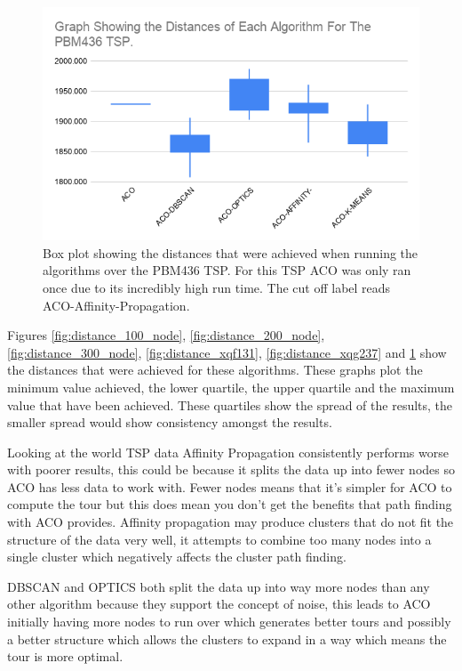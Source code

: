 \begin{figure}
    \centering
    \includegraphics[width=\textwidth]{figures/distance_pbm436_graph.png}
    \caption{Box plot showing the distances that were achieved when running the algorithms over the PBM436 TSP. For this TSP ACO was only ran once due to its incredibly high run time. The cut off label reads ACO-Affinity-Propagation.}
    \label{fig:distance_pbm436}
\end{figure}

Figures \ref{fig:distance_100_node}, \ref{fig:distance_200_node}, \ref{fig:distance_300_node}, \ref{fig:distance_xqf131}, \ref{fig:distance_xqg237} and \ref{fig:distance_pbm436} show the distances that were achieved for these algorithms. These graphs plot the minimum value achieved, the lower quartile, the upper quartile and the maximum value that have been achieved. These quartiles show the spread of the results, the smaller spread would show consistency amongst the results. 

Looking at the world TSP data Affinity Propagation consistently performs worse with poorer results, this could be because it splits the data up into fewer nodes so ACO has less data to work with. Fewer nodes means that it's simpler for ACO to compute the tour but this does mean you don't get the benefits that path finding with ACO provides. Affinity propagation may produce clusters that do not fit the structure of the data very well, it attempts to combine too many nodes into a single cluster which negatively affects the cluster  path finding.

DBSCAN and OPTICS both split the data up into way more nodes than any other algorithm because they support the concept of noise, this leads to ACO initially having more nodes to run over which generates better tours and possibly a better structure which allows the clusters to expand in a way which means the tour is more optimal.

